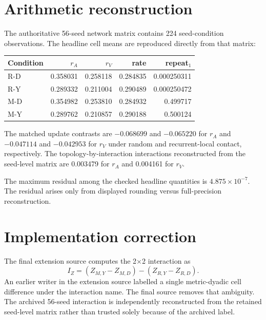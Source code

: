 \documentclass[11pt]{article}
\begin{document}
\section{Arithmetic reconstruction}
The authoritative 56-seed network matrix contains 224 seed-condition observations. The headline cell means are reproduced directly from that matrix:
\begin{center}
\begin{tabular}{lrrrr}
\toprule
Condition & $r_A$ & $r_V$ & rate & repeat$_1$\\
\midrule
R-D & 0.358031 & 0.258118 & 0.284835 & 0.000250311\\
R-Y & 0.289332 & 0.211004 & 0.290489 & 0.000250472\\
M-D & 0.354982 & 0.253810 & 0.284932 & 0.499717\\
M-Y & 0.289762 & 0.210857 & 0.290188 & 0.500124\\
\bottomrule
\end{tabular}
\end{center}
The matched update contrasts are $-0.068699$ and $-0.065220$ for $r_A$ and $-0.047114$ and $-0.042953$ for $r_V$ under random and recurrent-local contact, respectively. The topology-by-interaction interactions reconstructed from the seed-level matrix are 0.003479 for $r_A$ and 0.004161 for $r_V$.

The maximum residual among the checked headline quantities is $4.875\times10^{-7}$. The residual arises only from displayed rounding versus full-precision reconstruction.

\section{Implementation correction}
The final extension source computes the 2$\times$2 interaction as
\[
I_Z=(Z_{M,Y}-Z_{M,D})-(Z_{R,Y}-Z_{R,D}).
\]
An earlier writer in the extension source labelled a single metric-dyadic cell difference under the interaction name. The final source removes that ambiguity. The archived 56-seed interaction is independently reconstructed from the retained seed-level matrix rather than trusted solely because of the archived label.
\end{document}
